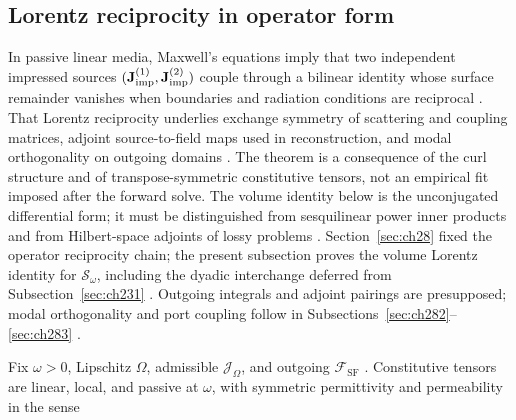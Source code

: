 \subsection{Lorentz reciprocity in operator form}
\label{sec:ch281}

In passive linear media, Maxwell's equations imply that two independent impressed sources
$(\mathbf{J}_{\mathrm{imp}}^{(1)},\mathbf{J}_{\mathrm{imp}}^{(2)})$ couple through a bilinear identity whose surface remainder vanishes
when boundaries and radiation conditions are reciprocal \cite{stratton1941,collin2001}. That
Lorentz reciprocity underlies exchange symmetry of scattering and coupling matrices, adjoint
source-to-field maps used in reconstruction, and modal orthogonality on outgoing domains
\cite{devaney2004,harrington2001}. The theorem is a consequence of the curl structure and of
transpose-symmetric constitutive tensors, not an empirical fit imposed after the forward solve.
The volume identity below is the unconjugated differential form; it must be distinguished from
sesquilinear power inner products and from Hilbert-space adjoints of lossy problems
\cite{stratton1941}.
Section~\ref{sec:ch28} fixed the operator reciprocity chain; the present subsection proves the
volume Lorentz identity for $\mathcal{S}_\omega$, including the dyadic interchange deferred from
Subsection~\ref{sec:ch231} \cite{stratton1941}. Outgoing integrals and adjoint pairings are
presupposed; modal orthogonality and port coupling follow in
Subsections~\ref{sec:ch282}--\ref{sec:ch283} \cite{harrington2001}.

Fix $\omega>0$, Lipschitz $\Omega$, admissible $\mathcal{J}_\Omega$, and outgoing
$\mathcal{F}_{\mathrm{SF}}$ \cite{stratton1941}. Constitutive tensors are linear, local, and
passive at $\omega$, with symmetric permittivity and permeability in the sense

